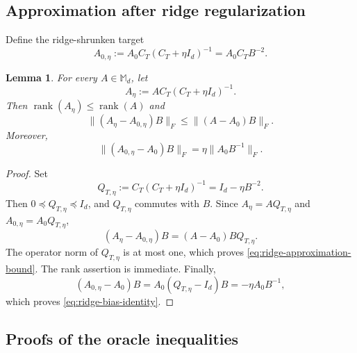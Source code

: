 \documentclass[11pt]{article}
\newtheorem{lemma}[theorem]{Lemma}
\begin{document}
\subsection{Approximation after ridge regularization}
\label{subsec:ridge-approximation}

Define the ridge-shrunken target
\begin{equation}
    A_{0,\eta}:=A_0C_T(C_T+\eta I_d)^{-1}
    =A_0C_TB^{-2}.
\label{eq:ridge-shrunken-target}
\end{equation}

\begin{lemma}%
\label{lem:ridge-approximation}
For every $A\in\mathbb M_d$, let
\[
    A_\eta:=AC_T(C_T+\eta I_d)^{-1}.
\]
Then $\operatorname{rank}(A_\eta)\leq\operatorname{rank}(A)$ and
\begin{equation}
    \big\|(A_\eta-A_{0,\eta})B\big\|_F
    \leq\big\|(A-A_0)B\big\|_F.
\label{eq:ridge-approximation-bound}
\end{equation}
Moreover,
\begin{equation}
    \big\|(A_{0,\eta}-A_0)B\big\|_F
    =\eta\big\|A_0B^{-1}\big\|_F.
\label{eq:ridge-bias-identity}
\end{equation}
\end{lemma}

\begin{proof}
Set
\[
    Q_{T,\eta}:=C_T(C_T+\eta I_d)^{-1}=I_d-\eta B^{-2}.
\]
Then $0\preceq Q_{T,\eta}\preceq I_d$, and $Q_{T,\eta}$ commutes with $B$.
Since $A_\eta=AQ_{T,\eta}$ and $A_{0,\eta}=A_0Q_{T,\eta}$,
\[
    (A_\eta-A_{0,\eta})B
    =(A-A_0)BQ_{T,\eta}.
\]
The operator norm of $Q_{T,\eta}$ is at most one, which proves
\eqref{eq:ridge-approximation-bound}. The rank assertion is immediate. Finally,
\[
    (A_{0,\eta}-A_0)B
    =A_0(Q_{T,\eta}-I_d)B
    =-\eta A_0B^{-1},
\]
which proves \eqref{eq:ridge-bias-identity}.
\end{proof}

\subsection{Proofs of the oracle inequalities}
\label{subsec:proofs-oracle}
\end{document}
